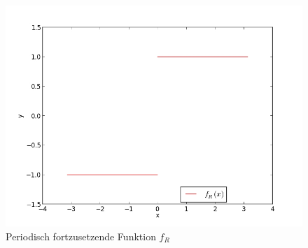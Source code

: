 	\begin{figure}[h]
		\begin{center}
		\includegraphics[scale=0.42]{picfrecht.jpg}
		\caption{Periodisch fortzusetzende Funktion $f_R$}
		\label{picfrecht}
		\end{center}	
	\end{figure}